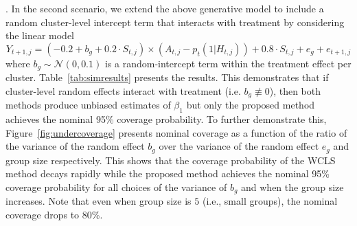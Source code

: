 \documentclass[12pt]{article}
\begin{document}
. In the second scenario, we extend the above generative model to include a random cluster-level intercept term that interacts with treatment by considering the linear model
\begin{equation}
Y_{t+1,j} = (-0.2 + b_g +  0.2 \cdot S_{t,j}) \times (A_{t,j} -p_t(1|H_{t,j})) + 0.8 \cdot S_{t,j} + e_g + e_{t+1,j}
\end{equation}
where $b_g \sim \mathcal{N}(0,0.1)$ is a random-intercept term within the treatment effect per cluster. Table~\ref{tab:simresults} presents the results.  This demonstrates that if cluster-level random effects interact with treatment  (i.e. $b_g \not \equiv 0$), then both methods produce unbiased estimates of $\beta_1$ but only the proposed method achieves the nominal 95\% coverage probability. To further demonstrate this, Figure~\ref{fig:undercoverage} presents nominal coverage as a function of the ratio of the variance of the random effect $b_g$ over the variance of the random effect $e_g$ and group size respectively.  This shows that the coverage probability of the WCLS method decays rapidly while the proposed method achieves the nominal 95\% coverage probability for all choices of the variance of $b_g$ and when the group size increases.  Note that even when group size is $5$ (i.e., small groups), the nominal coverage drops to 80\%.
\end{document}
